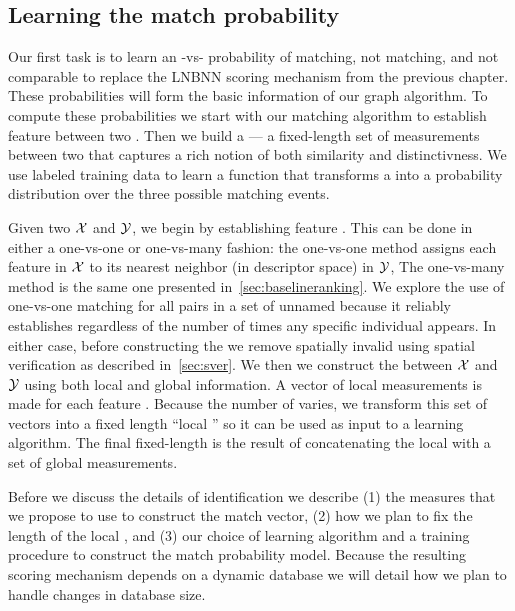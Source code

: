     \subsection{Learning the match probability}
        Our first task is to learn an \annot{}-vs-\annot{} probability of
          matching, not matching, and not comparable to replace the LNBNN
          scoring mechanism from the previous chapter.
        These probabilities will form the basic information of our graph
          algorithm.
        To compute these probabilities we start with our matching algorithm to
          establish feature \correspondences{} between two \annots{}.
        Then we build a \glossterm{\matchvec{}} --- a fixed-length set of
          measurements between two \annots{} that captures a rich notion of both
          similarity and distinctivness.
        We use labeled training data to learn a function that transforms a
          \matchvec{} into a probability distribution over the three possible
          matching events.

        Given two \annots{} $\mathcal{X}$ and $\mathcal{Y}$, we begin by establishing feature
          \correspondences{}.
        This can be done in either a one-vs-one or one-vs-many fashion:
        the one-vs-one method assigns each feature in \annot{} $\mathcal{X}$ to its
          nearest neighbor (in descriptor space) in $\mathcal{Y}$, The one-vs-many method
          is the same one presented in~\cref{sec:baselineranking}.
        We explore the use of one-vs-one matching for all pairs in a set of
          unnamed \annots{} because it reliably establishes \correspondences{}
          regardless of the number of times any specific individual appears.
        In either case, before constructing the \matchvec{} we remove
          spatially invalid \correspondences{} using spatial verification as
          described in~\cref{sec:sver}.
        We then we construct the \matchvec{} between $\mathcal{X}$ and $\mathcal{Y}$ using both
          local and global information.
        A vector of local measurements is made for each feature
          \correspondence{}.
        Because the number of \correspondences{} varies, we transform this set
          of vectors into a fixed length ``local \matchvec{}'' so it can be used
          as input to a learning algorithm.
        The final fixed-length \matchvec{} is the result of concatenating the
          local \matchvec{} with a set of global measurements.

        Before we discuss the details of identification we describe
        (1) the measures that we propose to use to construct the match vector,
        (2) how we plan to fix the length of the local \matchvec{}, and
        (3) our choice of learning algorithm and a training procedure to
          construct the match probability model.
        Because the resulting scoring mechanism depends on a dynamic database
          we will detail how we plan to handle changes in database size.

